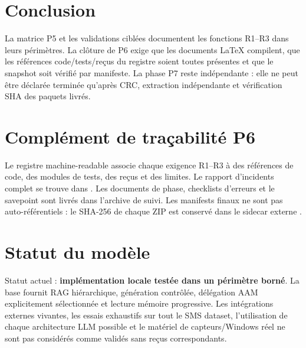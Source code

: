 \documentclass[11pt,a4paper]{article}
\begin{document}
\section{Conclusion}
La matrice P5 et les validations ciblées documentent les fonctions R1--R3 dans leurs périmètres. La clôture de P6 exige que les documents LaTeX compilent, que les références code/tests/reçus du registre soient toutes présentes et que le snapshot soit vérifié par manifeste. La phase P7 reste indépendante : elle ne peut être déclarée terminée qu'après CRC, extraction indépendante et vérification SHA des paquets livrés.

\section{Complément de traçabilité P6}
Le registre machine-readable associe chaque exigence R1--R3 à des références de code, des modules de tests, des reçus et des limites. Le rapport d'incidents complet se trouve dans . Les documents de phase, checklists d'erreurs et le savepoint sont livrés dans l'archive de suivi. Les manifests finaux ne sont pas auto-référentiels : le SHA-256 de chaque ZIP est conservé dans le sidecar externe .

\section{Statut du modèle}
Statut actuel : \textbf{implémentation locale testée dans un périmètre borné}. La base fournit RAG hiérarchique, génération contrôlée, délégation AAM explicitement sélectionnée et lecture mémoire progressive. Les intégrations externes vivantes, les essais exhaustifs sur tout le SMS dataset, l'utilisation de chaque architecture LLM possible et le matériel de capteurs/Windows réel ne sont pas considérés comme validés sans reçus correspondants.
\end{document}
